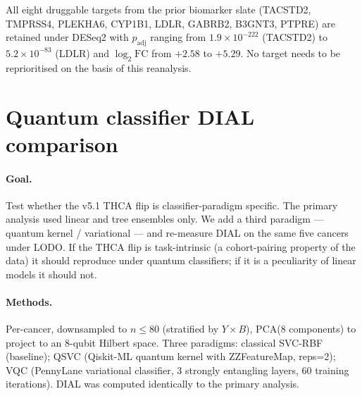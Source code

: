 \documentclass[11pt,a4paper]{article}
\begin{document}
All eight druggable targets from the prior biomarker slate
(TACSTD2, TMPRSS4, PLEKHA6, CYP1B1, LDLR, GABRB2, B3GNT3, PTPRE) are
retained under DESeq2 with $p_{\mathrm{adj}}$ ranging from
$1.9 \times 10^{-222}$ (TACSTD2) to $5.2 \times 10^{-83}$ (LDLR) and
$\log_2\mathrm{FC}$ from $+2.58$ to $+5.29$. No target needs to be
reprioritised on the basis of this reanalysis.

\section{Quantum classifier DIAL comparison}
\label{sec:S6}

\paragraph{Goal.} Test whether the v5.1 THCA flip is classifier-paradigm
specific. The primary analysis used linear and tree ensembles only.
We add a third paradigm --- quantum kernel / variational
\citep{havlicek2019qsvm, schuld2019qml, huang2021quantum} --- and
re-measure DIAL on the same five cancers under LODO. If the THCA flip
is task-intrinsic (a cohort-pairing property of the data) it should
reproduce under quantum classifiers; if it is a peculiarity of linear
models it should not.

\paragraph{Methods.} Per-cancer, downsampled to $n \leq 80$ (stratified
by $Y \times B$), PCA(8 components) to project to an 8-qubit Hilbert
space. Three paradigms: classical SVC-RBF (baseline); QSVC (Qiskit-ML
quantum kernel with ZZFeatureMap, reps=2); VQC (PennyLane variational
classifier, 3 strongly entangling layers, 60 training iterations).
DIAL was computed identically to the primary analysis.
\end{document}
